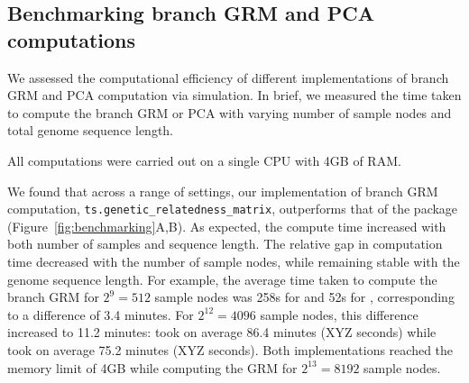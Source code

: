 

\subsection{Benchmarking branch GRM and PCA computations}

We assessed the computational efficiency of different implementations of
branch GRM and PCA computation via simulation.
%
In brief, we measured the time taken to compute the branch GRM or PCA
with varying number of sample nodes and total genome sequence length.
%

All computations were carried out on a single CPU with 4GB of RAM.

We found that across a range of settings, our implementation of branch GRM computation,
\texttt{ts.genetic\_relatedness\_matrix}, outperforms that of the \eGRM{} package
(Figure~\ref{fig:benchmarking}A,B).
%
As expected, the compute time increased with both number of samples and sequence length.
%
The relative gap in computation time decreased with the number of sample nodes,
while remaining stable with the genome sequence length.
%
For example, the average time taken to compute the branch GRM
for $2^9 = 512$ sample nodes was
258s for \eGRM{} and 52s for \tsGRM{},
corresponding to a difference of 3.4 minutes.
%
For $2^{12} = 4096$ sample nodes, this difference increased to 11.2 minutes:
\eGRM{} took on average 86.4 minutes (XYZ seconds) while
\tsGRM{} took on average 75.2 minutes (XYZ seconds).
%
Both implementations reached the memory limit of 4GB
while computing the GRM for $2^{13}=8192$ sample nodes.

